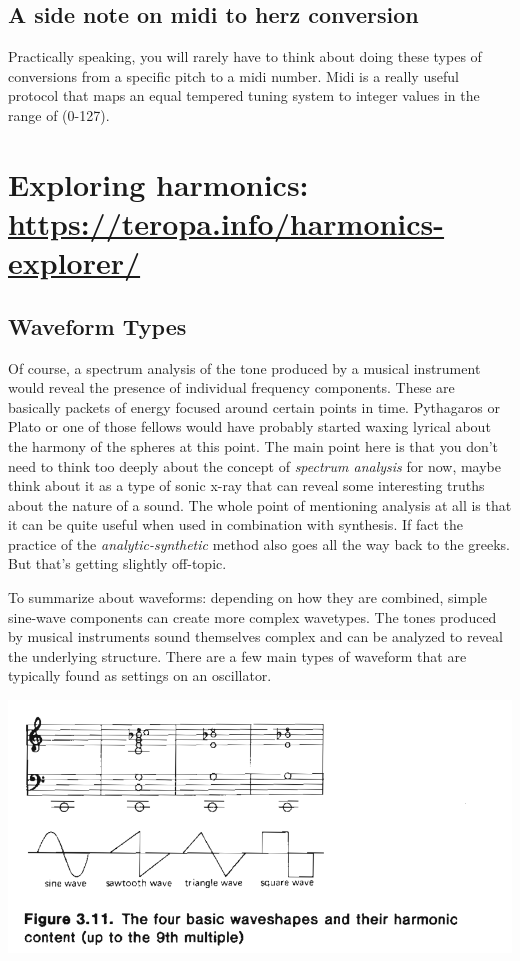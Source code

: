 \documentclass[11pt]{article}
\begin{document}
\subsection{A side note on midi to herz conversion}
\label{sec:org77bfeda}
Practically speaking, you will rarely have to think about doing these
types of conversions from a specific pitch to a midi number. Midi is a
really useful protocol that maps an equal tempered tuning system to
integer values in the range of (0-127).


\section{Exploring harmonics: \url{https://teropa.info/harmonics-explorer/}}
\label{sec:org6e6574c}

\subsection{Waveform Types}
\label{sec:org2f4537d}
Of course, a spectrum analysis of the tone produced by a musical
instrument would reveal the presence of individual frequency
components. These are basically packets of energy focused around
certain points in time. Pythagaros or Plato or one of those fellows
would have probably started waxing lyrical about the harmony of the
spheres at this point. 
The main point here is that you don't need to think too deeply about
the concept of \emph{spectrum analysis} for now, maybe think about it as a
type of sonic x-ray that can reveal some interesting truths about the
nature of a sound. 
The whole point of mentioning analysis at all is that it can be quite
useful when used in combination with synthesis. If fact the practice
of the \emph{analytic-synthetic} method also goes all the way back to the
greeks. But that's getting slightly off-topic.   

To summarize about waveforms: depending on how they are combined,
simple sine-wave components can create more complex wavetypes. The
tones produced by musical instruments sound themselves complex and can
be analyzed to reveal the underlying structure. There are a few main
types of waveform that are typically found as settings on an oscillator.

\begin{center}
\includegraphics[width=.9\linewidth]{./images/waveforms.png}
\end{center}
\end{document}
